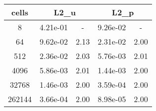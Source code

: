 \documentclass[10pt]{report}
\begin{document}
\begin{table}[H]
\begin{center}
\begin{tabular}{|c|c|c|c|c|} \hline
cells & 
\multicolumn{2}{|c|}{L2_u} & 
\multicolumn{2}{|c|}{L2_p}\\ \hline
8 & 4.21e-01 & - & 9.26e-02 & -\\ \hline
64 & 9.62e-02 & 2.13 & 2.31e-02 & 2.00\\ \hline
512 & 2.36e-02 & 2.03 & 5.76e-03 & 2.01\\ \hline
4096 & 5.86e-03 & 2.01 & 1.44e-03 & 2.00\\ \hline
32768 & 1.46e-03 & 2.00 & 3.59e-04 & 2.00\\ \hline
262144 & 3.66e-04 & 2.00 & 8.98e-05 & 2.00\\ \hline
\end{tabular}
\end{center}
\end{table}
\end{document}
